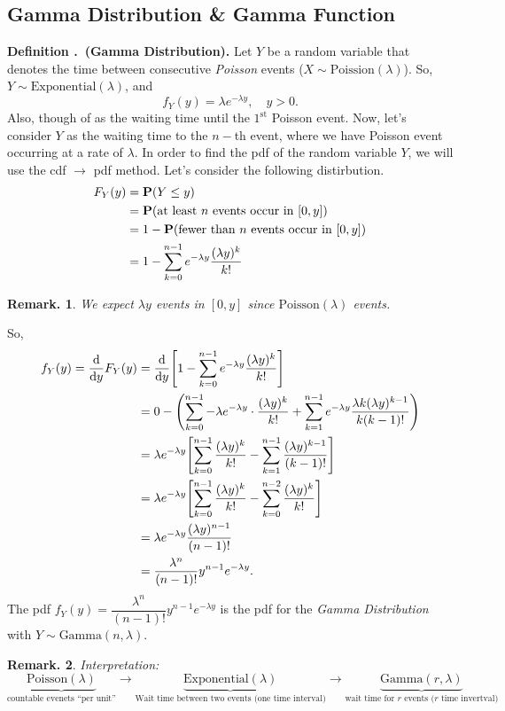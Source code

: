 \documentclass[12pt, a4paper]{article}
\newcounter{index}[subsection]
\newenvironment*{df}[1]{\par\noindent\textbf{Definition \thesubsection.\stepcounter{index}\theindex\ (#1).}}{\par}
\newtheorem*{rmk}{Remark.}
\def\P{\vb{P}}
\begin{document}
\subsection{Gamma Distribution \& Gamma Function}
\begin{df}{Gamma Distribution}
	Let $Y$ be a random variable that denotes the time between consecutive \textit{Poisson} events ($X\sim\text{Poission}(\lambda)$). So, $Y\sim\text{Exponential}(\lambda)$, and \[f_Y(y)=\lambda e^{-\lambda y},\quad y>0.\] Also, though of as the waiting time until the $1^\text{st}$ Poisson event. Now, let's consider $Y$ as the waiting time to the $n-$th event, where we have Poisson event occurring at a rate of $\lambda$. In order to find the pdf of the random variable $Y$, we  will use the cdf $\to$ pdf method. Let's consider the following distirbution. \begin{align*}F_Y(y)&=\P(Y\leq y)\\&=\P(\text{at least }n\text{ events occur in }[0,y])\\&=1-\P(\text{fewer than }n\text{ events occur in }[0,y])\\&=1-\sum_{k=0}^{n-1}e^{-\lambda y}\dfrac{(\lambda y)^k}{k!}\end{align*}
	\begin{rmk}
		We expect $\lambda y$ events in $[0,y]$ since $\text{Poisson}(\lambda)$ events.
	\end{rmk}
	So, \begin{align*}f_Y(y)=\dv{y}F_Y(y)&=\dv{y}\qty[1-\sum_{k=0}^{n-1}e^{-\lambda y}\dfrac{(\lambda y)^k}{k!}]\\&=0-\qty(\sum_{k=0}^{n-1}-\lambda e^{-\lambda y}\cdot\dfrac{(\lambda y)^k}{k!}+\sum_{k=1}^{n-1}e^{-\lambda y}\dfrac{\lambda k(\lambda y)^{k-1}}{k(k-1)!})\\&=\lambda e^{-\lambda y}\qty[\sum_{k=0}^{n-1}\dfrac{(\lambda y)^k}{k!}-\sum_{k=1}^{n-1}\dfrac{(\lambda y)^{k-1}}{(k-1)!}]\\&=\lambda e^{-\lambda y}\qty[\sum_{k=0}^{n-1}\dfrac{(\lambda y)^k}{k!}-\sum_{k=0}^{n-2}\dfrac{(\lambda y)^k}{k!}]\\&=\lambda e^{-\lambda y}\dfrac{(\lambda y)^{n-1}}{(n-1)!}\\&=\dfrac{\lambda^n}{(n-1)!}y^{n-1}e^{-\lambda y}.\end{align*}
	The pdf $f_Y(y)=\dfrac{\lambda^n}{(n-1)!}y^{n-1}e^{-\lambda y}$ is the pdf for the \textit{Gamma Distribution} with $Y\sim\text{Gamma}(n, \lambda)$.
\end{df}
\begin{rmk}
	Interpretation: \[\underbrace{\text{Poisson}(\lambda)}_\text{countable evenets ``per unit''}\longrightarrow\underbrace{\text{Exponential}(\lambda)}_\text{Wait time between two events (one time interval)}\longrightarrow\underbrace{\text{Gamma}(r,\lambda)}_{\text{wait time for }r\text{ events (} r\text{ time invertval)}}\]	
\end{rmk}
\end{document}
